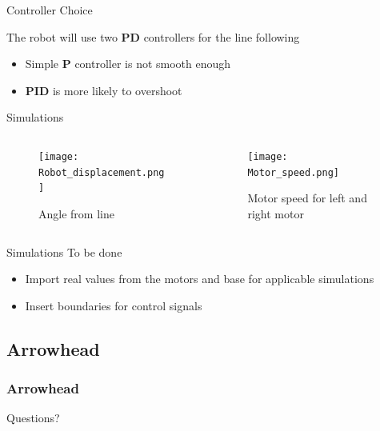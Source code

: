 \documentclass{beamer}
\begin{document}
    
    
    \begin{frame}{Controller Choice}
    
        The robot will use two \textbf{PD} controllers for the line following
        
        \begin{itemize}
            \item Simple \textbf{P} controller is not smooth enough
            \item \textbf{PID} is more likely to overshoot
        \end{itemize}
        
    \end{frame}
    
    
    \begin{frame}{Simulations}
    \begin{columns}
    \begin{column}[]{0.5\textwidth}
    \begin{figure}
        \centering
        \texttt{[image: Robot\_displacement.png]}
        \caption{Angle from line}
        \label{fig:my_label}
    \end{figure}
    \end{column}
    \begin{column}[]{0.5\textwidth}
    \begin{figure}
        \centering
        \texttt{[image: Motor\_speed.png]}
        \caption{Motor speed for left and right motor}
        \label{fig:my_label}
    \end{figure}
    \end{column}
    \end{columns}
        
    \end{frame}
    
    
    
    
    \begin{frame}{Simulations}
    To be done
    
    \begin{itemize}
        \item Import real values from the motors and base for applicable simulations
        \item Insert boundaries for control signals
    \end{itemize}
    
    \end{frame}

\subsection{Arrowhead}

\begin{frame}
    \frametitle{Arrowhead}
    

\end{frame}

\begin{frame}
    \begin{center}
        \Huge Questions?
    \end{center}
\end{frame}
\end{document}
